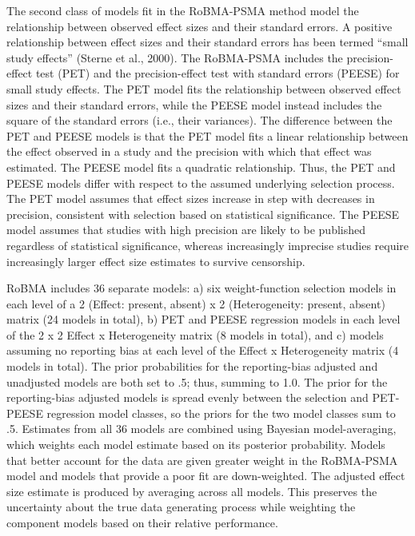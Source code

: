\documentclass[
  doc, donotrepeattitle,floatsintext]{apa7}
\begin{document}
The second class of models fit in the RoBMA-PSMA method model the relationship between observed effect sizes and their standard errors. A positive relationship between effect sizes and their standard errors has been termed ``small study effects'' (Sterne et al., 2000). The RoBMA-PSMA includes the precision-effect test (PET) and the precision-effect test with standard errors (PEESE) for small study effects. The PET model fits the relationship between observed effect sizes and their standard errors, while the PEESE model instead includes the square of the standard errors (i.e., their variances). The difference between the PET and PEESE models is that the PET model fits a linear relationship between the effect observed in a study and the precision with which that effect was estimated. The PEESE model fits a quadratic relationship. Thus, the PET and PEESE models differ with respect to the assumed underlying selection process. The PET model assumes that effect sizes increase in step with decreases in precision, consistent with selection based on statistical significance. The PEESE model assumes that studies with high precision are likely to be published regardless of statistical significance, whereas increasingly imprecise studies require increasingly larger effect size estimates to survive censorship.

RoBMA includes 36 separate models: a) six weight-function selection models in each level of a 2 (Effect: present, absent) x 2 (Heterogeneity: present, absent) matrix (24 models in total), b) PET and PEESE regression models in each level of the 2 x 2 Effect x Heterogeneity matrix (8 models in total), and c) models assuming no reporting bias at each level of the Effect x Heterogeneity matrix (4 models in total). The prior probabilities for the reporting-bias adjusted and unadjusted models are both set to .5; thus, summing to 1.0. The prior for the reporting-bias adjusted models is spread evenly between the selection and PET-PEESE regression model classes, so the priors for the two model classes sum to .5. Estimates from all 36 models are combined using Bayesian model-averaging, which weights each model estimate based on its posterior probability. Models that better account for the data are given greater weight in the RoBMA-PSMA model and models that provide a poor fit are down-weighted. The adjusted effect size estimate is produced by averaging across all models. This preserves the uncertainty about the true data generating process while weighting the component models based on their relative performance.
\end{document}
